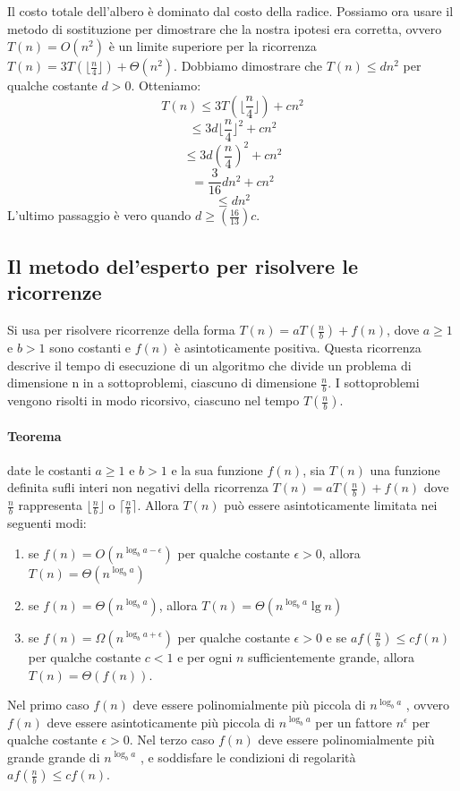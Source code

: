 \documentclass[11pt,a4paper]{article}
\begin{document}
Il costo totale dell’albero è dominato dal costo della radice.
Possiamo ora usare il metodo di sostituzione per dimostrare che la nostra ipotesi era corretta, ovvero
$T(n)=O(n^2)$ è un limite superiore per la ricorrenza $T(n) = 3T(\lfloor \frac{n}{4} \rfloor) + \Theta (n^2)$.
Dobbiamo dimostrare che $T(n) \leq dn^2$ per qualche costante $d > 0$.
Otteniamo:
\[T(n) \leq 3T(\lfloor \frac{n}{4} \rfloor) + c n^2\]
\[\leq 3d\lfloor \frac{n}{4} \rfloor^2 + c n^2\]
\[\leq 3d (\frac{n}{4})^2 + c n^2\]
\[= \frac{3}{16} d n^2 + c n^2\]
\[\leq d n^2\]
L’ultimo passaggio è vero quando $d \geq (\frac{16}{13})c$.

\subsection{Il metodo del’esperto per risolvere le ricorrenze}
Si usa per risolvere ricorrenze della forma $T(n) = aT(\frac{n}{b})+f(n)$, dove $a \geq 1$ e $b > 1$ sono costanti e $f(n)$ è
asintoticamente positiva.
Questa ricorrenza descrive il tempo di esecuzione di un algoritmo che divide un problema di dimensione n in
a sottoproblemi, ciascuno di dimensione $\frac{n}{b}$. I sottoproblemi vengono risolti in modo ricorsivo, ciascuno nel
tempo $T(\frac{n}{b})$.

\paragraph{Teorema} date le costanti $a \geq 1$ e $b > 1$ e la sua funzione $f(n)$, sia $T(n)$ una funzione definita sufli interi non
negativi della ricorrenza $T(n) = aT(\frac{n}{b})+f(n)$ dove $\frac{n}{b}$ rappresenta $\lfloor\frac{n}{b}\rfloor$ o $\lceil\frac{n}{b}\rceil$. Allora $T(n)$ può essere
asintoticamente limitata nei seguenti modi:
\begin{enumerate}
  \item se $f(n) = O(n^{\log_b a-\epsilon})$ per qualche costante $\epsilon > 0$, allora $T(n) = \Theta(n^{\log_b a})$
  \item se $f(n) = \Theta(n^{\log_b a})$, allora $T(n) = \Theta(n^{\log_b a} \lg n)$
  \item se $f(n) = \Omega(n^{\log_b a + \epsilon} )$ per qualche costante $\epsilon > 0$ e se $af(\frac{n}{b}) \leq cf(n)$ per qualche costante $c < 1$ e per ogni $n$
sufficientemente grande, allora $T(n) = \Theta(f(n))$.
\end{enumerate}
Nel primo caso $f(n)$ deve essere polinomialmente più piccola di $n^{\log_b a}$ , ovvero $f(n)$ deve essere
asintoticamente più piccola di $n^{\log_b a}$ per un fattore $n^\epsilon$ per qualche costante $\epsilon > 0$.
Nel terzo caso $f(n)$ deve essere polinomialmente più grande grande di $n^{\log_b a}$ , e soddisfare le condizioni di
regolarità $af(\frac{n}{b}) \leq cf(n)$.
\end{document}
